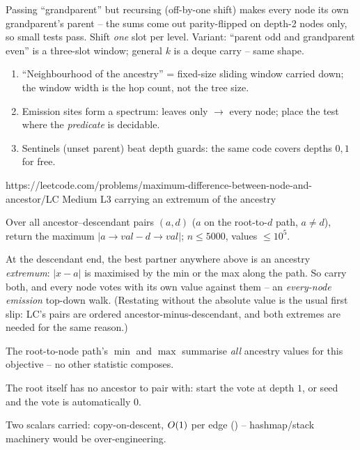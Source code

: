 \begin{warningbox}
Passing ``grandparent'' but recursing  (off-by-one shift)
makes every node its own grandparent's parent -- the sums come out parity-flipped
on depth-2 nodes only, so small tests pass. Shift \emph{one} slot per level.
Variant: ``parent odd and grandparent even'' is a three-slot window;
general $k$ is a deque carry -- same shape.
\end{warningbox}

\begin{insightbox}
\begin{enumerate}[nosep, leftmargin=1.6em]
  \item ``Neighbourhood of the ancestry'' = fixed-size sliding window carried
        down; the window width is the hop count, not the tree size.
  \item Emission sites form a spectrum: leaves only $\to$ every node; place the
        test where the \emph{predicate} is decidable.
  \item Sentinels (unset parent) beat depth guards: the same code covers depths
        $0,1$ for free.
\end{enumerate}
\end{insightbox}

  {https://leetcode.com/problems/maximum-difference-between-node-and-ancestor/}{LC Medium L3}
  {carrying an extremum of the ancestry}

\begin{problemstatement}
Over all ancestor--descendant pairs $(a,d)$ ($a$ on the root-to-$d$ path,
$a \neq d$), return the maximum $\left|a\to\mathit{val} - d\to\mathit{val}\right|$;
$n \le 5000$, values $\le 10^5$.
\end{problemstatement}

At the descendant end, the best partner anywhere above is an ancestry
\emph{extremum}: $|x - a|$ is maximised by the min or the max along the path. So
carry both, and every node votes with its own value against them -- an
\emph{every-node emission} top-down walk. (Restating without the absolute value
is the usual first slip: LC's pairs are ordered ancestor-minus-descendant, and
both extremes are needed for the same reason.)

\begin{observation}
The root-to-node path's $\min$ and $\max$ summarise \emph{all} ancestry values
for this objective -- no other statistic composes.
\end{observation}
\begin{observation}
The root itself has no ancestor to pair with: start the vote at depth $1$, or
seed  and the vote is automatically $0$.
\end{observation}
\begin{observation}
Two scalars carried: copy-on-descent, $O(1)$ per edge
() -- hashmap/stack machinery would be over-engineering.
\end{observation}

